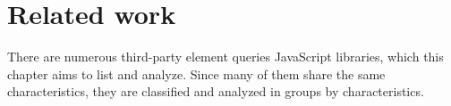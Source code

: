 \documentclass[a4paper,11pt]{kth-mag}
\begin{document}

  \chapter{Related work}\label{ch:related-work}
    There are numerous \gls{third-party} element queries \gls{JavaScript} libraries, which this chapter aims to list and analyze.
    Since many of them share the same characteristics, they are classified and analyzed in groups by characteristics.
\end{document}
